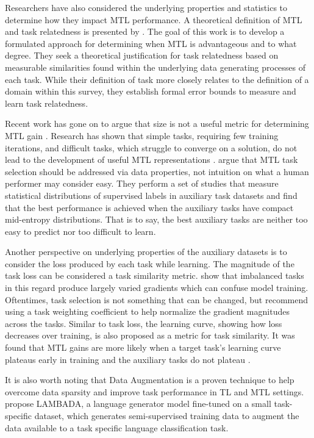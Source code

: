 \documentclass[twocolumn]{article}
\begin{document}
Researchers have also considered the underlying properties and statistics to determine how they impact MTL performance. A theoretical definition of MTL and task relatedness is presented by \cite{notion08}. The goal of this work is to develop a formulated approach for determining when MTL is advantageous and to what degree. They seek a theoretical justification for task relatedness based on measurable similarities found within the underlying data generating processes of each task. While their definition of task more closely relates to the definition of a domain within this survey, they establish formal error bounds to measure and learn task relatedness.

Recent work has gone on to argue that size is not a useful metric for determining MTL gain \citep{bentask17}. Research has shown that simple tasks, requiring few training iterations, and difficult tasks, which struggle to converge on a solution, do not lead to the development of useful MTL representations \citep{mtl97,decanlp18}. \cite{whenmtl17} argue that MTL task selection should be addressed via data properties, not intuition on what a human performer may consider easy. They perform a set of studies that measure statistical distributions of supervised labels in auxiliary task datasets and find that the best performance is achieved when the auxiliary tasks have compact mid-entropy distributions. That is to say, the best auxiliary tasks are neither too easy to predict nor too difficult to learn.

Another perspective on underlying properties of the auxiliary datasets is to consider the loss produced by each task while learning. The magnitude of the task loss can be considered a task similarity metric. \cite{whichtask19} show that imbalanced tasks in this regard produce largely varied gradients which can confuse model training. Oftentimes, task selection is not something that can be changed, but \cite{whichtask19} recommend using a task weighting coefficient to help normalize the gradient magnitudes across the tasks. Similar to task loss, the learning curve, showing how loss decreases over training, is also proposed as a metric for task similarity. It was found that MTL gains are more likely when a target task's learning curve plateaus early in training and the auxiliary tasks do not plateau \citep{bentask17}.

It is also worth noting that Data Augmentation is a proven technique to help overcome data sparsity and improve task performance in TL and MTL settings. \cite{dataaugment19} propose LAMBADA, a language generator model fine-tuned on a small task-specific dataset, which generates semi-supervised training data to augment the data available to a task specific language classification task.
\end{document}
